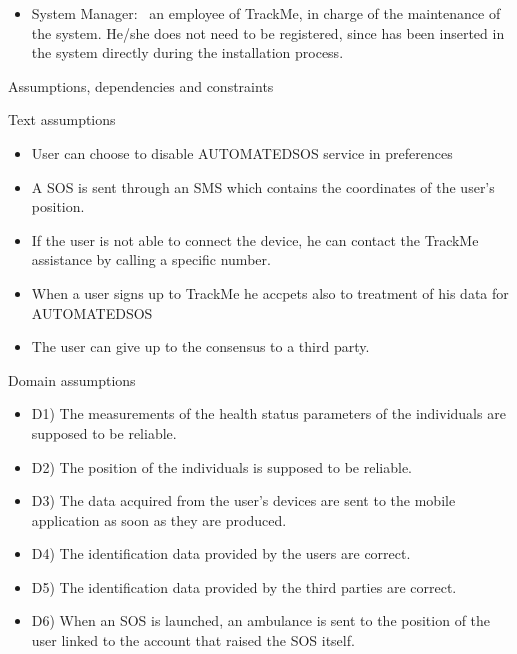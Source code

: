 \documentclass{article}
\begin{document}
\begin{legal}
\begin{legal}
{\begin{itemize}
 			\item{System Manager:  an employee of TrackMe, in charge of the maintenance of the system. He/she does not need to be registered, since has been inserted in the 					system directly during the installation process. }
			\end{itemize}
			}
		\item Assumptions, dependencies and constraints\\
			\begin{legal}
    			\item Text assumptions\\
    			{\normalfont
				\begin{itemize}
					\item User can choose to disable AUTOMATEDSOS service in preferences
					\item A SOS is sent through an SMS which contains the coordinates of the user's position.
					\item If the user is not able to connect the device, he can contact the TrackMe assistance by calling a specific number.
					\item When a user signs up to TrackMe he accpets also to treatment of his data for AUTOMATEDSOS
					\item The user can give up to the consensus to a third party.
				\end{itemize}}
			\item Domain assumptions \\
			{\normalfont
				\begin{itemize}
				\item D1) The measurements of the health status parameters of the individuals are supposed to be reliable.\\
				\item D2) The position of the individuals is supposed to be reliable.\\
				\item D3) The data acquired from the user’s devices are sent to the mobile application as soon as they are produced.\\
				\item D4) The identification data provided by the users are correct.\\
				\item D5) The identification data provided by the third parties are correct.\\
				\item D6) When an SOS is launched, an ambulance is sent to the position of the user linked to the account that raised the SOS itself. \\

\end{itemize}}
\end{legal}
\end{legal}
\end{legal}
\end{document}
